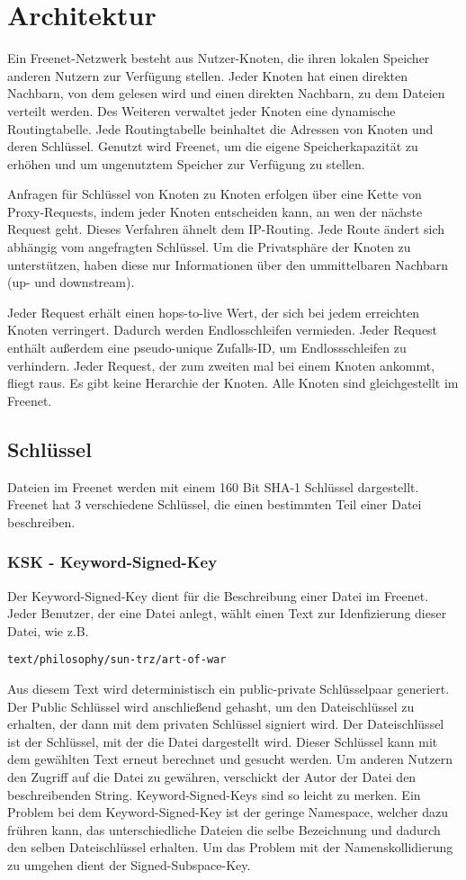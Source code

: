 \section{Architektur}
Ein Freenet-Netzwerk besteht aus Nutzer-Knoten, die ihren lokalen Speicher
anderen Nutzern zur Verfügung stellen. Jeder Knoten hat einen direkten Nachbarn,
von dem gelesen wird und einen direkten Nachbarn, zu dem Dateien verteilt
werden. Des Weiteren verwaltet jeder Knoten eine dynamische Routingtabelle.
Jede Routingtabelle beinhaltet die Adressen von Knoten und deren Schlüssel.
Genutzt wird Freenet, um die eigene Speicherkapazität zu erhöhen und um
ungenutztem Speicher zur Verfügung zu stellen.

Anfragen für Schlüssel von Knoten zu Knoten erfolgen über eine Kette von
Proxy-Requests, indem jeder Knoten entscheiden kann, an wen der nächste Request geht.
Dieses Verfahren ähnelt dem IP-Routing. Jede Route ändert sich abhängig vom
angefragten Schlüssel.
Um die Privatsphäre der Knoten zu unterstützen, haben diese nur Informationen
über den ummittelbaren Nachbarn (up- und downstream).

Jeder Request erhält einen hops-to-live Wert, der sich bei jedem erreichten
Knoten verringert. Dadurch werden Endlosschleifen vermieden.
Jeder Request enthält außerdem eine pseudo-unique Zufalls-ID, um Endlossschleifen zu
verhindern. Jeder Request, der zum zweiten mal bei einem Knoten ankommt, fliegt
raus. Es gibt keine Herarchie der Knoten. Alle Knoten sind gleichgestellt
im Freenet.

\subsection{Schlüssel}
Dateien im Freenet werden mit einem 160 Bit SHA-1 Schlüssel dargestellt.
Freenet hat 3 verschiedene Schlüssel, die einen bestimmten Teil einer Datei
beschreiben.

\subsubsection{KSK - Keyword-Signed-Key}
Der Keyword-Signed-Key dient für die Beschreibung einer Datei im Freenet. Jeder
Benutzer, der eine Datei anlegt, wählt einen Text zur Idenfizierung dieser
Datei, wie z.B.
\begin{lstlisting}
text/philosophy/sun-trz/art-of-war
\end{lstlisting}
Aus diesem Text wird deterministisch ein public-private Schlüsselpaar
generiert. Der Public Schlüssel wird anschließend gehasht, um den Dateischlüssel
zu erhalten, der dann mit dem privaten Schlüssel signiert wird. Der
Dateischlüssel ist der Schlüssel, mit der die Datei dargestellt wird. Dieser
Schlüssel kann mit dem gewählten Text erneut berechnet und gesucht werden. Um
anderen Nutzern den Zugriff auf die Datei zu gewähren, verschickt der Autor
der Datei den beschreibenden String. Keyword-Signed-Keys sind so leicht zu
merken. Ein Problem bei dem Keyword-Signed-Key ist der geringe Namespace,
welcher dazu frühren kann, das unterschiedliche Dateien die selbe Bezeichnung und
dadurch den selben Dateischlüssel erhalten. Um das Problem mit der
Namenskollidierung zu umgehen dient der Signed-Subspace-Key.

